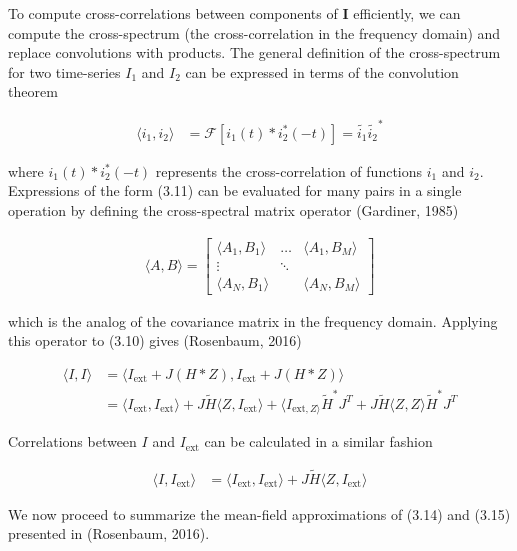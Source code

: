 \documentclass{ucetd}
\begin{document}
To compute cross-correlations between components of $\mathbf{I}$ efficiently, we can compute the cross-spectrum (the cross-correlation in the frequency domain) and replace convolutions with products. The general definition of the cross-spectrum for two time-series $I_{1}$ and $I_{2}$ can be expressed in terms of the convolution theorem

\begin{align}
\langle i_{1}, i_{2}\rangle &= \mathcal{F}\left[i_{1}(t)*i_{2}^{*}(-t)\right] = \tilde{i_{1}}\tilde{i_{2}}^{*}
\end{align}

where $i_{1}(t)*i_{2}^{*}(-t)$ represents the cross-correlation of functions $i_{1}$ and $i_{2}$. Expressions of the form (3.11) can be evaluated for many pairs in a single operation by defining the cross-spectral matrix operator (Gardiner, 1985)

\begin{align}
\langle A, B\rangle = \begin{bmatrix} 
    \langle A_{1}, B_{1}\rangle  & \dots & \langle A_{1}, B_{M}\rangle\\
    \vdots & \ddots & \\
    \langle A_{N}, B_{1}\rangle &        & \langle A_{N}, B_{M}\rangle
    \end{bmatrix}
\end{align}

which is the analog of the covariance matrix in the frequency domain. Applying this operator to (3.10) gives (Rosenbaum, 2016)

\begin{align}
\langle I, I \rangle &= \langle I_{\mathrm{ext}} + J(H*Z), I_{\mathrm{ext}} + J(H*Z) \rangle\\
&= \langle I_{\mathrm{ext}}, I_{\mathrm{ext}}\rangle  + J\tilde{H}\langle Z, I_{\mathrm{ext}} \rangle + \langle I_{\mathrm{ext}, Z\rangle}\tilde{H}^{*}J^{T} + J\tilde{H}\langle Z, Z\rangle \tilde{H}^{*}J^{T}
\end{align}

Correlations between $I$ and $I_{\mathrm{ext}}$ can be calculated in a similar fashion

\begin{align}
\langle I, I_{\mathrm{ext}} \rangle &= \langle I_{\mathrm{ext}}, I_{\mathrm{ext}}\rangle + J\tilde{H} \langle Z, I_{\mathrm{ext}}\rangle
\end{align}

We now proceed to summarize the mean-field approximations of (3.14) and (3.15) presented in (Rosenbaum, 2016). 
\end{document}

